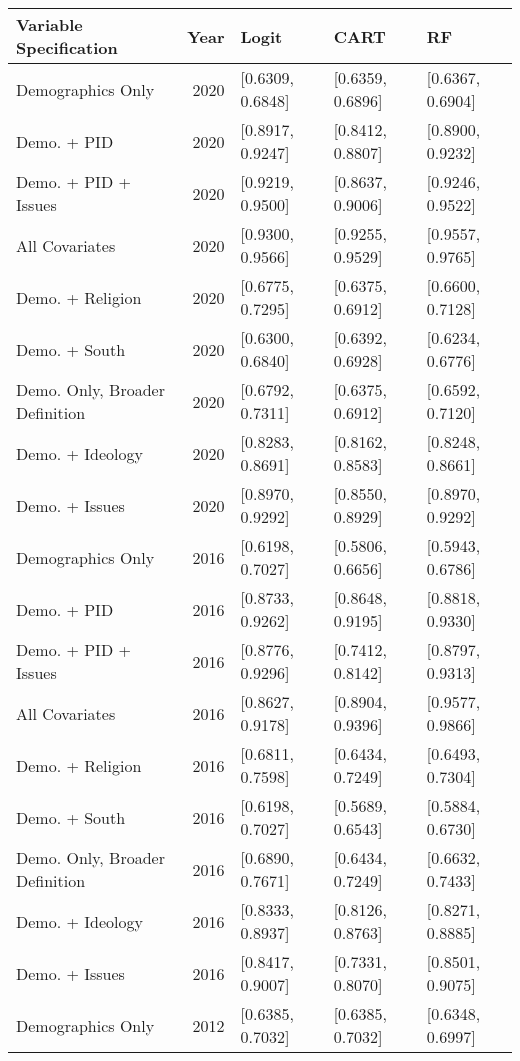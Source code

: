 \begin{longtable}{lrlll}
  \toprule
Variable Specification & Year & Logit & CART & RF \\ 
  \midrule
Demographics Only & 2020 & [0.6309, 0.6848] & [0.6359, 0.6896] & [0.6367, 0.6904] \\ 
  Demo. + PID & 2020 & [0.8917, 0.9247] & [0.8412, 0.8807] & [0.8900, 0.9232] \\ 
  Demo. + PID + Issues & 2020 & [0.9219, 0.9500] & [0.8637, 0.9006] & [0.9246, 0.9522] \\ 
  All Covariates & 2020 & [0.9300, 0.9566] & [0.9255, 0.9529] & [0.9557, 0.9765] \\ 
  Demo. + Religion & 2020 & [0.6775, 0.7295] & [0.6375, 0.6912] & [0.6600, 0.7128] \\ 
  Demo. + South & 2020 & [0.6300, 0.6840] & [0.6392, 0.6928] & [0.6234, 0.6776] \\ 
  Demo. Only, Broader Definition & 2020 & [0.6792, 0.7311] & [0.6375, 0.6912] & [0.6592, 0.7120] \\ 
  Demo. + Ideology & 2020 & [0.8283, 0.8691] & [0.8162, 0.8583] & [0.8248, 0.8661] \\ 
  Demo. + Issues & 2020 & [0.8970, 0.9292] & [0.8550, 0.8929] & [0.8970, 0.9292] \\ 
  Demographics Only & 2016 & [0.6198, 0.7027] & [0.5806, 0.6656] & [0.5943, 0.6786] \\ 
  Demo. + PID & 2016 & [0.8733, 0.9262] & [0.8648, 0.9195] & [0.8818, 0.9330] \\ 
  Demo. + PID + Issues & 2016 & [0.8776, 0.9296] & [0.7412, 0.8142] & [0.8797, 0.9313] \\ 
  All Covariates & 2016 & [0.8627, 0.9178] & [0.8904, 0.9396] & [0.9577, 0.9866] \\ 
  Demo. + Religion & 2016 & [0.6811, 0.7598] & [0.6434, 0.7249] & [0.6493, 0.7304] \\ 
  Demo. + South & 2016 & [0.6198, 0.7027] & [0.5689, 0.6543] & [0.5884, 0.6730] \\ 
  Demo. Only, Broader Definition & 2016 & [0.6890, 0.7671] & [0.6434, 0.7249] & [0.6632, 0.7433] \\ 
  Demo. + Ideology & 2016 & [0.8333, 0.8937] & [0.8126, 0.8763] & [0.8271, 0.8885] \\ 
  Demo. + Issues & 2016 & [0.8417, 0.9007] & [0.7331, 0.8070] & [0.8501, 0.9075] \\ 
  Demographics Only & 2012 & [0.6385, 0.7032] & [0.6385, 0.7032] & [0.6348, 0.6997] \\ 

\end{longtable}

